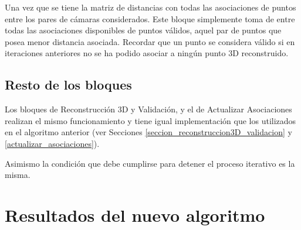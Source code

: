 Una vez que se tiene la matriz de distancias con todas las asociaciones de puntos entre los pares de cámaras considerados. Este bloque simplemente toma de entre todas las asociaciones disponibles de puntos válidos, aquel par de puntos que posea menor distancia asociada.
Recordar que un punto se considera válido si en iteraciones anteriores no se ha podido asociar a ningún punto 3D reconstruido.

\subsection{Resto de los bloques}

Los bloques de Reconstrucción 3D y Validación, y el de Actualizar Asociaciones realizan el mismo funcionamiento y tiene igual implementación que los utilizados en el algoritmo anterior (ver Secciones \ref{seccion_reconstruccion3D_validacion} y \ref{actualizar_asociaciones}).

  Asimismo la condición que debe cumplirse para detener el proceso iterativo es la misma.

  
  
\section{Resultados del nuevo algoritmo}  



